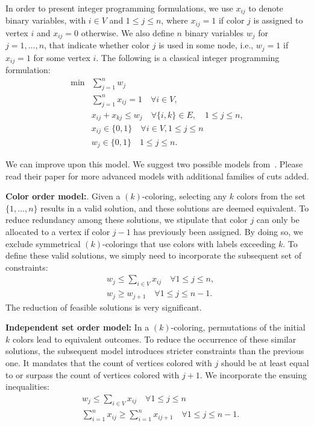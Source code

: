 In order to present integer programming formulations, we use $x_{i j}$ to denote binary variables, with $i \in V$ and $1 \leqslant j \leqslant n$, where $x_{i j}=1$ if color $j$ is assigned to vertex $i$ and $x_{i j}=0$ otherwise. We also define $n$ binary variables $w_j$ for $j=1, \ldots, n$, that indicate whether color $j$ is used in some node, i.e., $w_j=1$ if $x_{i j}=1$ for some vertex $i$.
The following is a classical integer programming formulation:
$$
\begin{aligned}
\min & \sum_{j=1}^n w_j \\
& \sum_{j=1}^n x_{i j}=1 \quad \forall i \in V, \\
& x_{i j}+x_{k j} \leqslant w_j \quad \forall\{i, k\} \in E, \quad 1 \leqslant j \leqslant n, \\
& x_{i j} \in\{0,1\} \quad \forall i \in V, 1 \leqslant j \leqslant n\\
& w_j \in\{0,1\} \quad 1 \leqslant j \leqslant n .
\end{aligned}
$$


We can improve upon this model.  We suggest two possible models from~\cite{MENDEZDIAZ2008159}.  Please read their paper for more advanced models with additional families of cuts added.

\textbf{ Color order model:}. 
Given a $(k)$-coloring, selecting any $k$ colors from the set $\{1, \ldots, n\}$ results in a valid solution, and these solutions are deemed equivalent. To reduce redundancy among these solutions, we stipulate that color $j$ can only be allocated to a vertex if color $j-1$ has previously been assigned. By doing so, we exclude symmetrical $(k)$-colorings that use colors with labels exceeding $k$. To define these valid solutions, we simply need to incorporate the subsequent set of constraints:
$$
\begin{aligned}
& w_j \leqslant \sum_{i \in V} x_{i j} \quad \forall 1 \leqslant j \leqslant n, \\
& w_j \geqslant w_{j+1} \quad \forall 1 \leqslant j \leqslant n-1 .
\end{aligned}
$$
The reduction of feasible solutions is very significant.

\textbf{ Independent set order model:} 
In a $(k)$-coloring, permutations of the initial $k$ colors lead to equivalent outcomes. To reduce the occurrence of these similar solutions, the subsequent model introduces stricter constraints than the previous one. It mandates that the count of vertices colored with $j$ should be at least equal to or surpass the count of vertices colored with $j+1$. We incorporate the ensuing inequalities:
$$
\begin{aligned}
& w_j \leqslant \sum_{i \in V} x_{i j} \quad \forall 1 \leqslant j \leqslant n \\
& \sum_{i=1}^n x_{i j} \geqslant \sum_{i=1}^n x_{i j+1} \quad \forall 1 \leqslant j \leqslant n-1 .
\end{aligned}
$$

